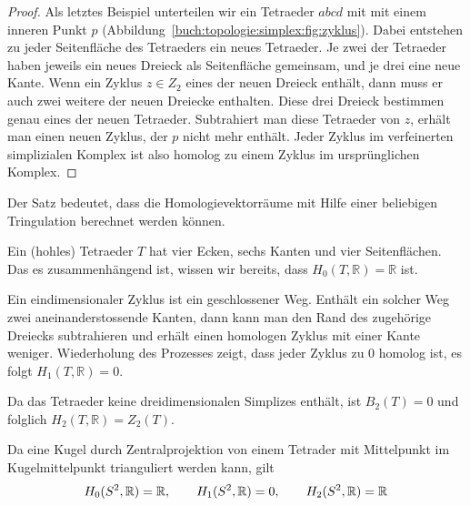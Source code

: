 \begin{proof}
Als letztes Beispiel unterteilen wir ein Tetraeder $abcd$ mit
mit einem inneren Punkt $p$ (Abbildung~\ref{buch:topologie:simplex:fig:zyklus}).
%
Dabei entstehen zu jeder Seitenfläche des Tetraeders ein neues 
Tetraeder.
Je zwei der Tetraeder haben jeweils ein neues Dreieck als Seitenfläche
gemeinsam, und je drei eine neue Kante.
Wenn ein Zyklus $z\in Z_2$ eines der neuen Dreieck enthält, dann
muss er auch zwei weitere der neuen Dreiecke enthalten.
Diese drei Dreieck bestimmen genau eines der neuen Tetraeder.
Subtrahiert man diese Tetraeder von $z$, erhält man einen neuen
Zyklus, der $p$ nicht mehr enthält.
Jeder Zyklus im verfeinerten simplizialen Komplex ist also homolog
zu einem Zyklus im ursprünglichen Komplex.
\end{proof}

Der Satz bedeutet, dass die Homologievektorräume mit Hilfe einer
beliebigen Tringulation berechnet werden können.

\begin{beispiel}
\label{buch:topologie:euler:beispiel:tetraeder}
Ein (hohles) Tetraeder $T$ hat vier Ecken, sechs Kanten und vier Seitenflächen.
Das es zusammenhängend ist, wissen wir bereits, dass
$H_0(T,\mathbb{R})=\mathbb{R}$ ist.

Ein eindimensionaler Zyklus ist ein geschlossener Weg.
Enthält ein solcher Weg zwei aneinanderstossende Kanten, dann kann
man den Rand des zugehörige Dreiecks subtrahieren und erhält
einen homologen Zyklus mit einer Kante weniger.
Wiederholung des Prozesses zeigt, dass jeder Zyklus zu 0 homolog
ist, es folgt $H_1(T,\mathbb{R})=0$.

Da das Tetraeder keine dreidimensionalen Simplizes enthält, ist 
$B_2(T)=0$ und folglich $H_2(T,\mathbb{R})=Z_2(T)$.
\end{beispiel}

\begin{beispiel}
\label{buch:topologie:euler:beispiel:kugel}
Da eine Kugel durch Zentralprojektion von einem Tetrader mit
Mittelpunkt im Kugelmittelpunkt trianguliert werden kann, gilt
\[
H_0(S^2,\mathbb{R}) = \mathbb{R},\qquad
H_1(S^2,\mathbb{R}) = 0,\qquad
H_2(S^2,\mathbb{R}) = \mathbb{R}
\qedhere
\]
\end{beispiel}

%

